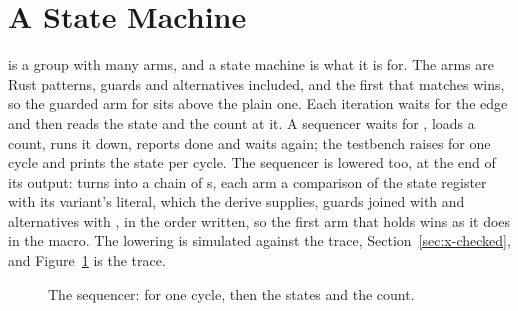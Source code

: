 \section{A State Machine}
\label{sec:x-case}

 is a  group with many arms, and a state machine is
what it is for. The arms are Rust patterns, guards and alternatives
included, and the first that matches wins, so the guarded arm for
 sits above the plain one. Each iteration waits for the
edge and then reads the state and the count at it. A sequencer waits
for ,
loads a count, runs it down, reports done and waits again; the
testbench raises  for one cycle and prints the state per
cycle. The sequencer is lowered too, at the end of its output:
\code{\#[lower]} turns  into a chain of s,
each arm a comparison of the state register with its variant's
literal, which the  derive supplies, guards joined with
\code{\&\&} and alternatives with \code{||}, in the order written, so
the first arm that holds wins as it does in the macro. The lowering is
simulated against the trace, Section~\ref{sec:x-checked}, and
Figure~\ref{fig:x-case} is the trace.

\begin{figure}[htbp]
\centering

\caption{The sequencer:  for one cycle, then the states and the count.}
\label{fig:x-case}
\end{figure}




